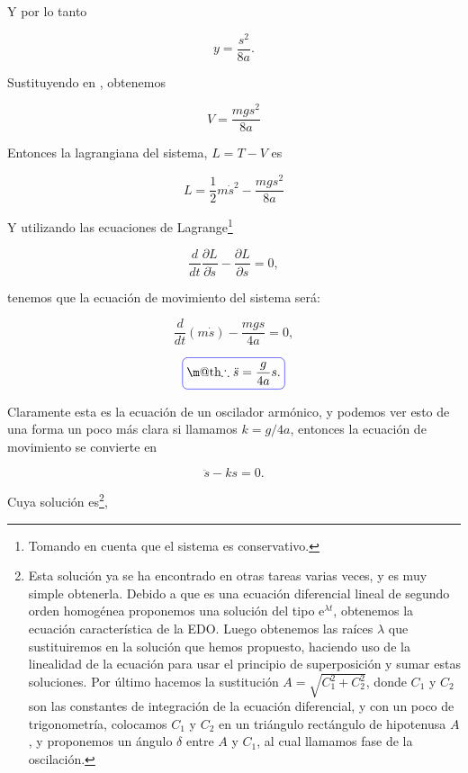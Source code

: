 \documentclass[a4paper,10pt]{article}
\makeatletter
\numberwithin{equation}{section}
\newcommand*{\boxcolor}{blue}
\renewcommand{\boxed}[1]{\textcolor{\boxcolor}{%
\tikz[baseline={([yshift=-1ex]current bounding box.center)}] \node [rectangle, minimum width=1ex,rounded corners,draw] {\normalcolor\m@th$\displaystyle#1$};}}
\newcommand{\euler}{\mathrm{e}}
\makeatother
\begin{document}
Y por lo tanto

\begin{equation}
 y = \frac{s^2}{8a}.
 \label{eq:yCiclo}
\end{equation}

Sustituyendo  en , obtenemos 

\begin{equation}
 V = \frac{mgs^2}{8a}
\end{equation}

Entonces la lagrangiana del sistema, $L = T - V$ es 

\begin{equation}
 L = \frac{1}{2} m \dot{s}^2 - \frac{mgs^2}{8a}
\end{equation}

Y utilizando las ecuaciones de Lagrange\footnote{Tomando en cuenta que el sistema es conservativo.} 


\begin{equation}
 \frac{d}{dt}\frac{\partial L}{\partial \dot{s}} - \frac{\partial L}{\partial s} = 0,
\end{equation}

tenemos que la ecuación de movimiento del sistema será:

\begin{equation}
 \frac{d}{dt} (m\dot{s}) - \frac{mgs}{4a} = 0,
\end{equation}

\begin{equation}
 \boxed{\therefore \ddot{s} = \frac{g}{4a} s.}
\end{equation}

Claramente esta es la ecuación de un oscilador armónico, y podemos ver esto de una 
forma un poco más clara si llamamos $k = g/4a$, entonces la ecuación de movimiento 
se convierte en

\begin{equation}
 \ddot{s} - ks = 0.
\end{equation}

Cuya solución es\footnote{Esta solución ya se ha encontrado en otras tareas 
varias veces, y es muy simple obtenerla. Debido a que es una ecuación diferencial lineal
de segundo orden homogénea proponemos una solución del tipo $\euler^{\lambda t}$, obtenemos la 
ecuación característica de la EDO. Luego obtenemos las raíces $\lambda$ que sustituiremos
en la solución que hemos propuesto, haciendo uso de la linealidad de la ecuación para 
usar el principio de superposición y sumar estas soluciones. Por último hacemos la 
sustitución $A = \sqrt{C_1^2+ C_2^2}$, donde $C_1$ y $C_2$ son las constantes de 
integración de la ecuación diferencial, y con un poco de trigonometría, colocamos 
$C_1$ y $C_2$ en un triángulo rectángulo de hipotenusa $A$, y proponemos un ángulo
$\delta$ entre $A$ y $C_1$, al cual llamamos fase de la oscilación.},
\end{document}
